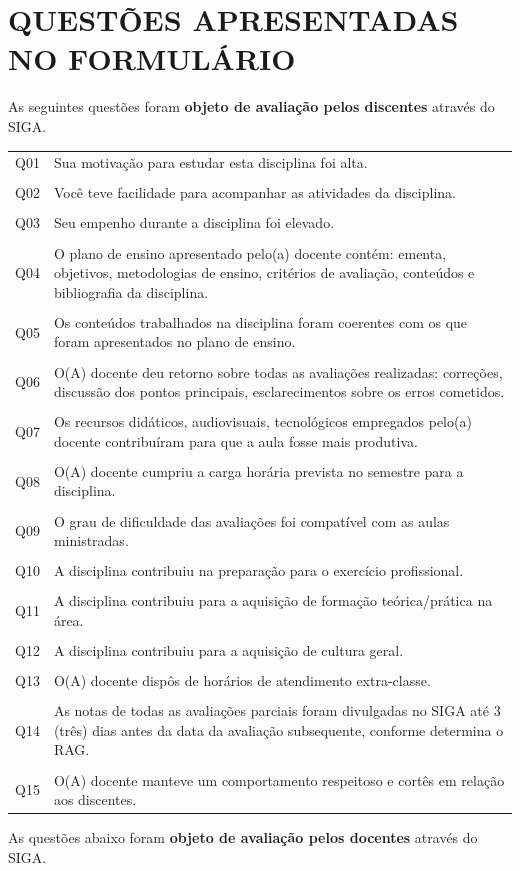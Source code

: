 \documentclass[a4paper,10pt]{article}
\begin{document}
\section{QUESTÕES APRESENTADAS NO FORMULÁRIO}
As seguintes questões foram {\bf objeto de avaliação pelos discentes} através do SIGA.

\begin{center}
\small{
\begin{tabularx}{\linewidth}{l|X}
Q01&Sua motivação para estudar esta disciplina foi alta.\\\\
Q02&Você teve facilidade para acompanhar as atividades da disciplina.\\\\
Q03&Seu empenho durante a disciplina foi elevado.\\\\
Q04&O plano de ensino apresentado pelo(a) docente contém: ementa, objetivos, metodologias de ensino, critérios de avaliação, conteúdos e bibliografia da disciplina.\\\\
Q05&Os conteúdos trabalhados na disciplina foram coerentes com os que foram apresentados no plano de ensino.\\\\
Q06&O(A) docente deu retorno sobre todas as avaliações realizadas: correções, discussão dos pontos principais, esclarecimentos sobre os erros cometidos.\\\\
Q07&Os recursos didáticos, audiovisuais, tecnológicos empregados pelo(a) docente contribuíram para que a aula fosse mais produtiva.\\\\
Q08&O(A) docente cumpriu a carga horária prevista no semestre para a disciplina.\\\\
Q09&O grau de dificuldade das avaliações foi compatível com as aulas ministradas.\\\\
Q10&A disciplina contribuiu na preparação para o exercício profissional.\\\\
Q11&A disciplina contribuiu para a aquisição de formação teórica/prática na área. \\\\
Q12&A disciplina contribuiu para a aquisição de cultura geral.\\\\
Q13&O(A) docente dispôs de horários de atendimento extra-classe.\\\\
Q14& As notas de todas as avaliações parciais foram divulgadas no SIGA até 3 (três) dias antes da data da avaliação subsequente, conforme determina o RAG. \\\\
Q15&O(A) docente manteve um comportamento respeitoso e cortês em relação aos discentes.
\end{tabularx}
}
\end{center}
As questões abaixo foram {\bf objeto de avaliação pelos docentes} através do SIGA.
\end{document}
